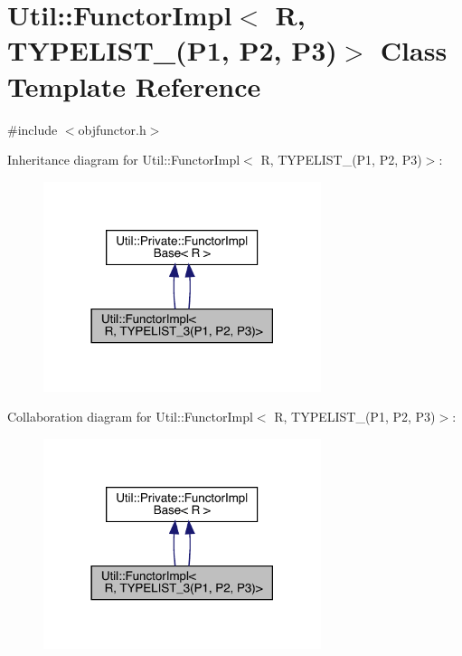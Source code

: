 \hypertarget{classUtil_1_1FunctorImpl_3_01R_00_01TYPELIST__3_07P1_00_01P2_00_01P3_08_4}{}\section{Util\+:\+:Functor\+Impl$<$ R, T\+Y\+P\+E\+L\+I\+S\+T\+\_(P1, P2, P3)$>$ Class Template Reference}
\label{classUtil_1_1FunctorImpl_3_01R_00_01TYPELIST__3_07P1_00_01P2_00_01P3_08_4}


{\ttfamily \#include $<$objfunctor.\+h$>$}



Inheritance diagram for Util\+:\+:Functor\+Impl$<$ R, T\+Y\+P\+E\+L\+I\+S\+T\+\_(P1, P2, P3)$>$\+:\nopagebreak
\begin{figure}[H]
\begin{center}
\leavevmode
\includegraphics[width=230pt]{d0/d65/classUtil_1_1FunctorImpl_3_01R_00_01TYPELIST__3_07P1_00_01P2_00_01P3_08_4__inherit__graph}
\end{center}
\end{figure}


Collaboration diagram for Util\+:\+:Functor\+Impl$<$ R, T\+Y\+P\+E\+L\+I\+S\+T\+\_(P1, P2, P3)$>$\+:\nopagebreak
\begin{figure}[H]
\begin{center}
\leavevmode
\includegraphics[width=230pt]{dd/db3/classUtil_1_1FunctorImpl_3_01R_00_01TYPELIST__3_07P1_00_01P2_00_01P3_08_4__coll__graph}
\end{center}
\end{figure}
